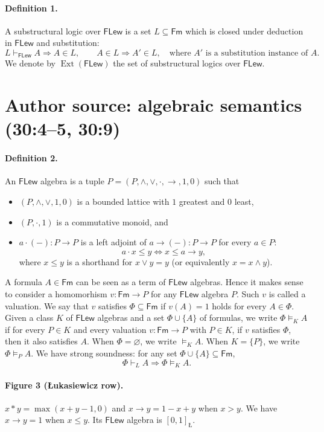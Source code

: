 \documentclass[10pt,a4paper]{article}
\newcommand{\FLew}{\mathsf{FLew}}
\newcommand{\Luk}{\text{\L}}
\begin{document}
\paragraph{Definition 1.} A substructural logic over $\FLew$ is a set $L\subseteq\mathsf{Fm}$ which is closed under deduction in $\FLew$ and substitution:
\[
 L\vdash_{\FLew}A\Longrightarrow A\in L,\qquad
 A\in L\Longrightarrow A'\in L,\quad\text{where $A'$ is a substitution instance of $A$.}
\]
We denote by $\operatorname{Ext}(\FLew)$ the set of substructural logics over $\FLew$.
\section*{Author source: algebraic semantics (30:4--5, 30:9)}
\paragraph{Definition 2.} An $\FLew$ algebra is a tuple $P=(P,\wedge,\vee,\cdot,\to,1,0)$ such that
\begin{itemize}
\item $(P,\wedge,\vee,1,0)$ is a bounded lattice with $1$ greatest and $0$ least,
\item $(P,\cdot,1)$ is a commutative monoid, and
\item $a\cdot(-):P\to P$ is a left adjoint of $a\to(-):P\to P$ for every $a\in P$:
\[
 a\cdot x\le y\Longleftrightarrow x\le a\to y,
\]
where $x\le y$ is a shorthand for $x\vee y=y$ (or equivalently $x=x\wedge y$).
\end{itemize}
A formula $A\in\mathsf{Fm}$ can be seen as a term of $\FLew$ algebras. Hence it makes sense to consider a homomorhism $v:\mathsf{Fm}\to P$ for any $\FLew$ algebra $P$. Such $v$ is called a valuation. We say that $v$ satisfies $\Phi\subseteq\mathsf{Fm}$ if $v(A)=1$ holds for every $A\in\Phi$.
Given a class $K$ of $\FLew$ algebras and a set $\Phi\cup\{A\}$ of formulas, we write $\Phi\models_K A$ if for every $P\in K$ and every valuation $v:\mathsf{Fm}\to P$ with $P\in K$, if $v$ satisfies $\Phi$, then it also satisfies $A$. When $\Phi=\varnothing$, we write $\models_K A$. When $K=\{P\}$, we write $\Phi\models_P A$.
We have strong soundness: for any set $\Phi\cup\{A\}\subseteq\mathsf{Fm}$,
\[
 \Phi\vdash_L A\Longrightarrow\Phi\models_K A.
\]
\paragraph{Figure 3 (Łukasiewicz row).} $x*y=\max(x+y-1,0)$ and $x\to y=1-x+y$ when $x>y$. We have $x\to y=1$ when $x\le y$. Its $\FLew$ algebra is $[0,1]_{\Luk}$.
\end{document}
